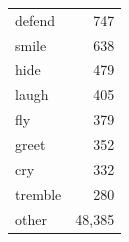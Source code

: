 \documentclass[a4j,12pt,dvipdfmx]{jsreport}
\begin{document}
\begin{table}[htbp]
\begin{minipage}[t]{0.48\linewidth}
\begin{tabular}{lr}
         defend             & 747      \\
         smile              & 638      \\
         hide               & 479      \\
         laugh              & 405      \\
         fly                & 379      \\
         greet              & 352      \\
         cry                & 332      \\
         tremble            & 280      \\
         other              & 48{,}385 \\
         \bottomrule
      \end{tabular}
   \end{minipage}
\end{table}
\end{document}
